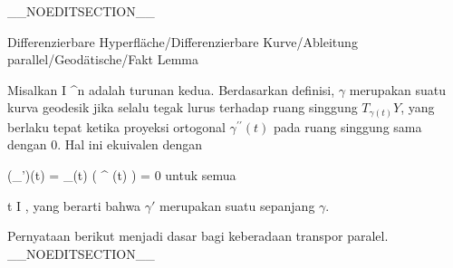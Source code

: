__NOEDITSECTION__

{Differenzierbare Hyperfläche/Differenzierbare Kurve/Ableitung parallel/Geodätische/Fakt}
{Lemma}
{}
{

\faktzusatz {}
\faktzusatz {}

}
{

Misalkan
\maabbdisp {\gamma^{\prime \prime}} { I } { \R^n
} {}
adalah turunan kedua. Berdasarkan definisi, $\gamma$ merupakan suatu kurva geodesik jika
 selalu tegak lurus terhadap ruang singgung $T_{\gamma(t)} Y$, yang berlaku tepat ketika proyeksi ortogonal $\gamma^{\prime \prime}(t)$ pada ruang singgung sama dengan $0$. Hal ini ekuivalen dengan

\mavergleichskettedisp
{\vergleichskette
{ (\nabla_\gamma \gamma')(t)
}
{ =} { \pi_{\gamma(t)} \left(  \gamma^{\prime \prime} (t)  \right)
}
{ =} { 0
}
{ } {
}
{ } {
}
}
{}{}{}
untuk semua

\mavergleichskette
{\vergleichskette
{ t
}
{ \in }{ I
}
{  }{
}
{    }{
}
{   }{
}
}
{}{}{,}
yang berarti bahwa $\gamma'$ merupakan suatu
sepanjang $\gamma$.

}

Pernyataan berikut menjadi dasar bagi keberadaan transpor paralel.
__NOEDITSECTION__

